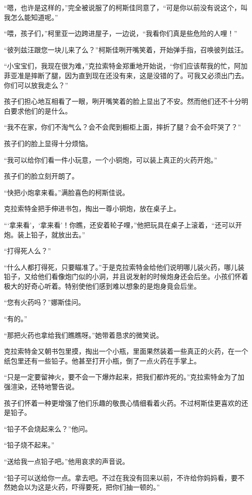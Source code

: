 \par “嗯，也许是这样的，”完全被说服了的柯斯佳同意了，“可是你以前没有说这个，叫我怎么能知道呢。”
\par “喂，孩子们，”柯里亚一边跨进屋子，一边说，“我看你们真是些危险的人哩！”
\par “彼列兹汪跟您一块儿来了么？”柯斯佳咧开嘴笑着，开始弹手指，召唤彼列兹汪。
\par “小宝宝们，我现在很为难，”克拉索特金郑重地开始说，“你们应该帮我的忙，阿加菲亚准是摔断了腿，因为直到现在还没有来，这是没错的了。可我又必须出门去。你们可以放我走么？”
\par 孩子们担心地互相看了一眼，咧开嘴笑着的脸上显出了不安。然而他们还不十分明白要求他们的是什么。
\par “我不在家，你们不淘气么？会不会爬到橱柜上面，摔折了腿？会不会吓哭了？”
\par 孩子们的脸上显得十分烦恼。
\par “我可以给你们看一件小玩意，一个小铜炮，可以装上真正的火药开炮。”
\par 孩子们的脸立刻开朗了。
\par “快把小炮拿来看。”满脸喜色的柯斯佳说。
\par 克拉索特金把手伸进书包，掏出一尊小铜炮，放在桌子上。
\par “‘拿来看’，‘拿来看’！你瞧，还安着轮子哩，”他把玩具在桌子上滚着，“还可以开炮。装上铅子，就放出去。”
\par “打得死人么？”
\par “什么人都打得死，只要瞄准了。”于是克拉索特金给他们说明哪儿装火药，哪儿装铅子，又给他们看像炮门似的小洞，并且说发射的时候炮身还会后坐。小孩们怀着极大的好奇心听着。特别使他们感到难以想象的是炮身竟会后坐。
\par “您有火药吗？”娜斯佳问。
\par “有的。”
\par “那把火药也拿给我们瞧瞧呀。”她带着恳求的微笑说。
\par 克拉索特金又朝书包里摸，掏出一个小瓶，里面果然装着一些真正的火药，在一个纸包里还有一些铅子。他甚至打开小瓶，倒了一点火药在手掌上。
\par “只是一定要留神火，要不会一下爆炸起来，把我们都炸死的。”克拉索特金为了加强渲染，还特地警告说。
\par 孩子们怀着一种更增强了他们乐趣的敬畏心情细看着火药。不过柯斯佳更喜欢的还是铅子。
\par “铅子不会烧起来么？”他问。
\par “铅子烧不起来。”
\par “送给我一点铅子吧。”他用哀求的声音说。
\par “铅子可以送给你一点。拿去吧。不过在我没有回来以前，不许给你妈妈看，要不然她会以为这是火药，吓得要死，把你们抽一顿的。”
